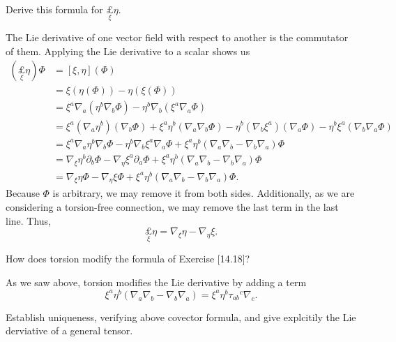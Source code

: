 \documentclass[../the-road-to-reality.tex]{subfiles}
\begin{document}
\begin{questions}
\question Derive this formula for $\underset{\xi}{\pounds}\eta$.
  \begin{solution}
    The Lie derivative of one vector field with respect to another is the
    commutator of them. Applying the Lie derivative to a scalar shows us
    \begin{align*}
      (\underset{\xi}{\pounds}\eta)\Phi &= [\xi, \eta](\Phi) \\
                                        &= \xi(\eta(\Phi)) - \eta(\xi(\Phi)) \\
                                        &= \xi^a\nabla_a(\eta^b\nabla_b\Phi) - \eta^b\nabla_b(\xi^a\nabla_a\Phi) \\
                                        &= \xi^a(\nabla_a\eta^b)(\nabla_b\Phi) + \xi^a\eta^b(\nabla_a\nabla_b\Phi) - \eta^b(\nabla_b\xi^a)(\nabla_a\Phi) - \eta^b\xi^a(\nabla_b\nabla_a\Phi) \\
                                        &= \xi^a\nabla_a\eta^b\nabla_b\Phi - \eta^b\nabla_b\xi^a\nabla_a\Phi + \xi^a\eta^b(\nabla_a\nabla_b - \nabla_b\nabla_a)\Phi \\
                                        &= \nabla_\xi\eta^b\partial_b\Phi - \nabla_\eta\xi^a\partial_a\Phi + \xi^a\eta^b(\nabla_a\nabla_b - \nabla_b\nabla_a)\Phi \\
      &= \nabla_\xi\eta\Phi - \nabla_\eta\xi\Phi + \xi^a\eta^b(\nabla_a\nabla_b - \nabla_b\nabla_a)\Phi.
    \end{align*}
    Because $\Phi$ is arbitrary, we may remove it from both sides. Additionally,
    as we are considering a torsion-free connection, we may remove the last term
    in the last line. Thus,
    \[
      \underset{\xi}{\pounds}\eta = \nabla_\xi\eta - \nabla_\eta\xi.
    \]
  \end{solution}

\question How does torsion modify the formula of Exercise [14.18]?

  \begin{solution}
    As we saw above, torsion modifies the Lie derivative by adding a term
    \[
      \xi^a\eta^b(\nabla_a\nabla_b - \nabla_b\nabla_a) = \xi^a\eta^b{\tau_{ab}}^c\nabla_c.
    \]
  \end{solution}

\question Establish uniqueness, verifying above covector formula, and give
    explcitily the Lie derviative of a general tensor.


\end{questions}
\end{document}
